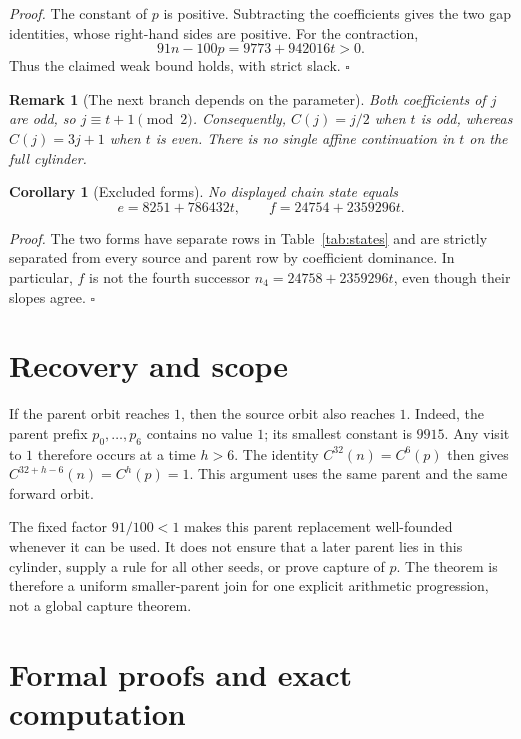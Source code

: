 \documentclass[11pt,letterpaper]{article}
\newtheorem{corollary}[theorem]{Corollary}
\newtheorem{remark}[theorem]{Remark}
\newenvironment{proof}{\noindent\textit{Proof.}}{\hfill\(\square\)}
\begin{document}
\begin{proof}
The constant of \(p\) is positive. Subtracting the coefficients gives the
two gap identities, whose right-hand sides are positive.
For the contraction,
\[
91n-100p=9773+942016t>0.
\]
Thus the claimed weak bound holds, with strict slack.
\end{proof}

\begin{remark}[The next branch depends on the parameter]
Both coefficients of \(j\) are odd, so \(j\equiv t+1\pmod2\).
Consequently, \(C(j)=j/2\) when \(t\) is odd, whereas
\(C(j)=3j+1\) when \(t\) is even.
There is no single affine continuation in \(t\) on the full cylinder.
\end{remark}

\begin{corollary}[Excluded forms]
No displayed chain state equals
\[
e=8251+786432t,\qquad f=24754+2359296t.
\]
\end{corollary}

\begin{proof}
The two forms have separate rows in Table~\ref{tab:states} and are
strictly separated from every source and parent row by coefficient
dominance. In particular, \(f\) is not the fourth successor
\(n_4=24758+2359296t\), even though their slopes agree.
\end{proof}

\section{Recovery and scope}

If the parent orbit reaches \(1\), then the source orbit also reaches \(1\).
Indeed, the parent prefix \(p_0,\ldots,p_6\) contains no value \(1\);
its smallest constant is \(9915\).
Any visit to \(1\) therefore occurs at a time \(h>6\).
The identity \(C^{32}(n)=C^6(p)\) then gives
\(C^{32+h-6}(n)=C^h(p)=1\).
This argument uses the same parent and the same forward orbit.

The fixed factor \(91/100<1\) makes this parent replacement
well-founded whenever it can be used. It does not ensure that a later
parent lies in this cylinder, supply a rule for all other seeds, or prove
capture of \(p\).
The theorem is therefore a uniform smaller-parent join for one
explicit arithmetic progression, not a global capture theorem.

\section{Formal proofs and exact computation}
\end{document}
